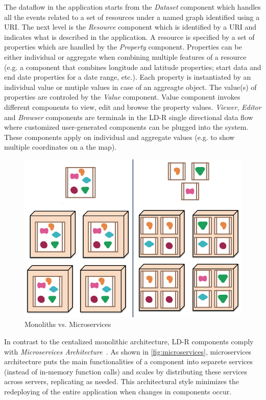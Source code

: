 \documentclass{acm_proc_article-sp}
\begin{document}
The dataflow in the application starts from the \emph{Dataset} component which handles all the events related to a set of resources under a named graph identified using a URI.
The next level is the \emph{Resource} component which is identified by a URI and indicates what is described in the application.
A resource is specified by a set of properties which are handled by the \emph{Property} component. 
Properties can be either individual or aggregate when combining multiple features of a resource (e.g. a component that combines longitude and latitude properties; start data and end date properties for a date range, etc.).
Each property is instantiated by an individual value or mutiple values in case of an aggreagte object. 
The value(s) of properties are controled by the \emph{Value} component.
Value component invokes different components to view, edit and browse the property values.
\emph{Viewer}, \emph{Editor} and \emph{Browser} components are terminals in the LD-R single directional data flow where customized user-generated components can be plugged into the system.
These components apply on individual and aggregate values (e.g. to show multiple coordinates on a the map).

\begin{figure}[tb]
  \includegraphics[width=.8\linewidth]{images/microservices.jpg}
  \caption{Monoliths vs. Microservices~\cite{microservices}}
  \label{fig:microservices}
\end{figure}

In contrast to the centalized monolithic architecture, LD-R components comply with \emph{Microservices Architecture}~\cite{microservices}.
As shown in \autoref{fig:microservices}, microservices architecture puts the main functionalities of a component into separete services (instead of in-memory function calls) and scales by distributing these services across servers, replicating as needed.
This architectural style minimizes the redeploying of the entire application when changes in components occur.
\end{document}
